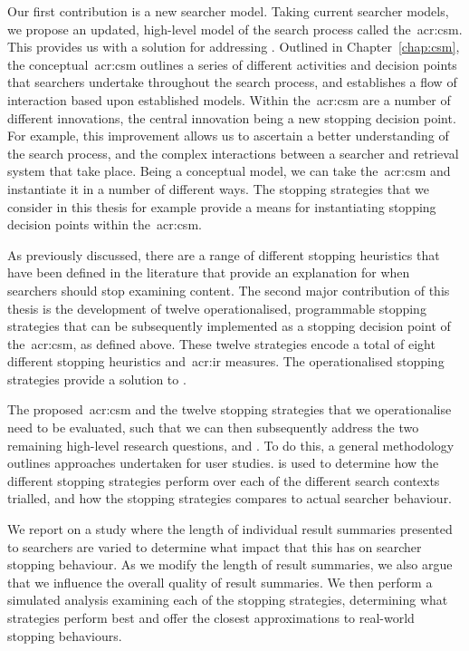 \noindent
{} Our first contribution is a new searcher model. Taking current searcher models, we propose an updated, high-level model of the search process called the~\gls{acr:csm}. This provides us with a solution for addressing . Outlined in Chapter~\ref{chap:csm}, the conceptual~\gls{acr:csm} outlines a series of different activities and decision points that searchers undertake throughout the search process, and establishes a flow of interaction based upon established models. Within the~\gls{acr:csm} are a number of different innovations, the central innovation being a new stopping decision point. For example, this improvement allows us to ascertain a better understanding of the search process, and the complex interactions between a searcher and retrieval system that take place. Being a conceptual model, we can take the~\gls{acr:csm} and instantiate it in a number of different ways. The stopping strategies that we consider in this thesis for example provide a means for instantiating stopping decision points within the~\gls{acr:csm}.

\noindent
{} As previously discussed, there are a range of different stopping heuristics that have been defined in the literature that provide an explanation for when searchers should stop examining content. The second major contribution of this thesis is the development of twelve operationalised, programmable stopping strategies that can be subsequently implemented as a stopping decision point of the~\gls{acr:csm}, as defined above. These twelve strategies encode a total of eight different stopping heuristics and~\gls{acr:ir} measures. The operationalised stopping strategies provide a solution to .

\noindent
{} The proposed~\gls{acr:csm} and the twelve stopping strategies that we operationalise need to be evaluated, such that we can then subsequently address the two remaining high-level research questions,  and . To do this, a general methodology outlines approaches undertaken for user studies.  is used to determine how the different stopping strategies perform over each of the different search contexts trialled, and how the stopping strategies compares to actual searcher behaviour.

\noindent
{} We report on a study where the length of individual result summaries presented to searchers are varied to determine what impact that this has on searcher stopping behaviour. As we modify the length of result summaries, we also argue that we influence the overall quality of result summaries. We then perform a simulated analysis examining each of the stopping strategies, determining what strategies perform best and offer the closest approximations to real-world stopping behaviours.

